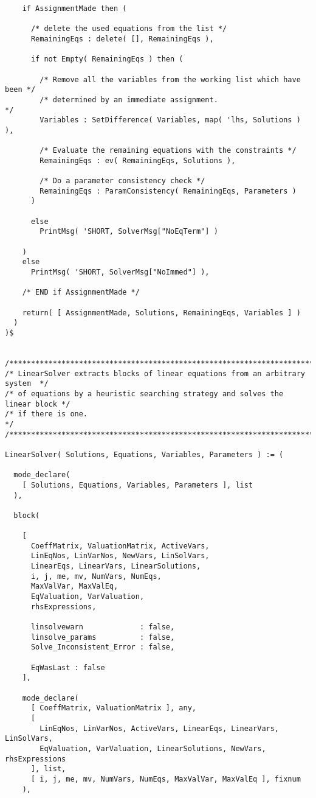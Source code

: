 \begin{verbatim}
    if AssignmentMade then (

      /* delete the used equations from the list */
      RemainingEqs : delete( [], RemainingEqs ),

      if not Empty( RemainingEqs ) then (

        /* Remove all the variables from the working list which have been */
        /* determined by an immediate assignment.                         */
        Variables : SetDifference( Variables, map( 'lhs, Solutions ) ),

        /* Evaluate the remaining equations with the constraints */
        RemainingEqs : ev( RemainingEqs, Solutions ),

        /* Do a parameter consistency check */
        RemainingEqs : ParamConsistency( RemainingEqs, Parameters )
      )

      else
        PrintMsg( 'SHORT, SolverMsg["NoEqTerm"] )

    )
    else
      PrintMsg( 'SHORT, SolverMsg["NoImmed"] ),

    /* END if AssignmentMade */

    return( [ AssignmentMade, Solutions, RemainingEqs, Variables ] )
  )
)$


/******************************************************************************/
/* LinearSolver extracts blocks of linear equations from an arbitrary system  */
/* of equations by a heuristic searching strategy and solves the linear block */
/* if there is one.                                                           */
/******************************************************************************/

LinearSolver( Solutions, Equations, Variables, Parameters ) := (

  mode_declare(
    [ Solutions, Equations, Variables, Parameters ], list
  ),

  block(

    [
      CoeffMatrix, ValuationMatrix, ActiveVars,
      LinEqNos, LinVarNos, NewVars, LinSolVars,
      LinearEqs, LinearVars, LinearSolutions,
      i, j, me, mv, NumVars, NumEqs,
      MaxValVar, MaxValEq,
      EqValuation, VarValuation,
      rhsExpressions,

      linsolvewarn             : false,
      linsolve_params          : false,
      Solve_Inconsistent_Error : false,

      EqWasLast : false
    ],

    mode_declare(
      [ CoeffMatrix, ValuationMatrix ], any,
      [
        LinEqNos, LinVarNos, ActiveVars, LinearEqs, LinearVars, LinSolVars,
        EqValuation, VarValuation, LinearSolutions, NewVars, rhsExpressions
      ], list,
      [ i, j, me, mv, NumVars, NumEqs, MaxValVar, MaxValEq ], fixnum
    ),


\end{verbatim}
